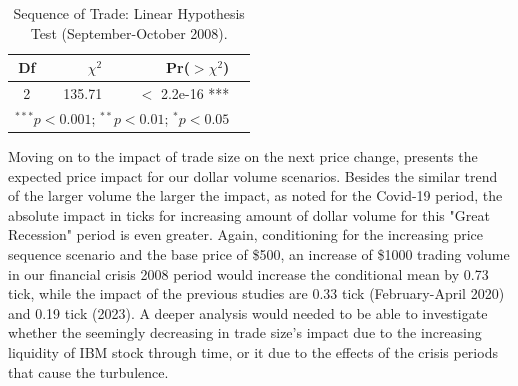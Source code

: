 \begin{table}[H]
    \centering
    \vspace{0.5em}
    \begin{tabular}{crrl}
        \toprule
        Df & $\chi^2$ & Pr($>$$\chi^2$) \\
        \midrule
         2 & 135.71 & $<$ 2.2e-16 *** \\ 
         \bottomrule
        \multicolumn{3}{l}{$^{***}p < 0.001$; $^{**}p < 0.01$; $^{*}p < 0.05$}
    \end{tabular}
        \caption{Sequence of Trade: Linear Hypothesis Test (September-October 2008).}
    \label{tab:table-27}
\end{table}

Moving on to the impact of trade size on the next price change,  presents the expected price impact for our dollar volume scenarios. Besides the similar trend of the larger volume the larger the impact, as noted for the Covid-19 period, the absolute impact in ticks for increasing amount of dollar volume for this "Great Recession" period is even greater. Again, conditioning for the increasing price sequence scenario and the base price of \$500, an increase of \$1000 trading volume in our financial crisis 2008 period would increase the conditional mean by 0.73 tick, while the impact of the previous studies are 0.33 tick (February-April 2020) and 0.19 tick (2023). A deeper analysis would needed to be able to investigate whether the seemingly decreasing in trade size's impact due to the increasing liquidity of IBM stock through time, or it due to the effects of the crisis periods that cause the turbulence.







